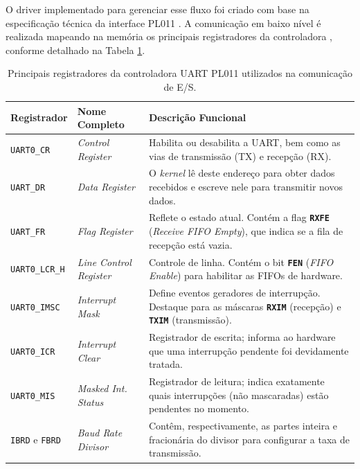 O driver implementado para gerenciar esse fluxo foi criado com base na especificação técnica da interface PL011 \cite{jankovic:qemu-uart-interface}. A comunicação em baixo nível é realizada mapeando na memória os principais registradores da controladora \cite{arm:summary-registers}, conforme detalhado na Tabela \ref{tab:uart-registradores}.


\begin{table}[htbp]
    \centering
    \renewcommand{\arraystretch}{1.3}
    \begin{tabular}{@{}llp{8cm}@{}}
        \hline
        \textbf{Registrador} & \textbf{Nome Completo} & \textbf{Descrição Funcional} \\
        \hline
        \texttt{UART0\_CR} & \textit{Control Register} & Habilita ou desabilita a UART, bem como as vias de transmissão (TX) e recepção (RX). \\
        \texttt{UART\_DR} & \textit{Data Register} & O \textit{kernel} lê deste endereço para obter dados recebidos e escreve nele para transmitir novos dados. \\
        \texttt{UART\_FR} & \textit{Flag Register} & Reflete o estado atual. Contém a flag \textbf{\texttt{RXFE}} (\textit{Receive FIFO Empty}), que indica se a fila de recepção está vazia. \\
        \texttt{UART0\_LCR\_H} & \textit{Line Control Register} & Controle de linha. Contém o bit \textbf{\texttt{FEN}} (\textit{FIFO Enable}) para habilitar as FIFOs de hardware. \\
        \texttt{UART0\_IMSC} & \textit{Interrupt Mask} & Define eventos geradores de interrupção. Destaque para as máscaras \textbf{\texttt{RXIM}} (recepção) e \textbf{\texttt{TXIM}} (transmissão). \\
        \texttt{UART0\_ICR} & \textit{Interrupt Clear} & Registrador de escrita; informa ao hardware que uma interrupção pendente foi devidamente tratada. \\
        \texttt{UART0\_MIS} & \textit{Masked Int. Status} & Registrador de leitura; indica exatamente quais interrupções (não mascaradas) estão pendentes no momento. \\
        \texttt{IBRD} e \texttt{FBRD} & \textit{Baud Rate Divisor} & Contêm, respectivamente, as partes inteira e fracionária do divisor para configurar a taxa de transmissão. \\
        \hline
    \end{tabular}
    \caption{Principais registradores da controladora UART PL011 utilizados na comunicação de E/S.}
    \label{tab:uart-registradores}
\end{table}


